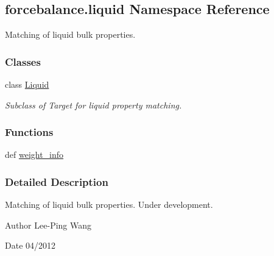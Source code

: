 \hypertarget{namespaceforcebalance_1_1liquid}{\subsection{forcebalance.\-liquid Namespace Reference}
\label{namespaceforcebalance_1_1liquid}
}


Matching of liquid bulk properties.  


\subsubsection*{Classes}
\begin{DoxyCompactItemize}
\item 
class \hyperlink{classforcebalance_1_1liquid_1_1Liquid}{Liquid}
\begin{DoxyCompactList}\small\item\em Subclass of Target for liquid property matching. \end{DoxyCompactList}\end{DoxyCompactItemize}
\subsubsection*{Functions}
\begin{DoxyCompactItemize}
\item 
def \hyperlink{namespaceforcebalance_1_1liquid_a6f7d54263236f8788c319aee86b460b6}{weight\-\_\-info}
\end{DoxyCompactItemize}


\subsubsection{Detailed Description}
Matching of liquid bulk properties. Under development.

\begin{DoxyAuthor}{Author}
Lee-\/\-Ping Wang 
\end{DoxyAuthor}
\begin{DoxyDate}{Date}
04/2012 
\end{DoxyDate}


